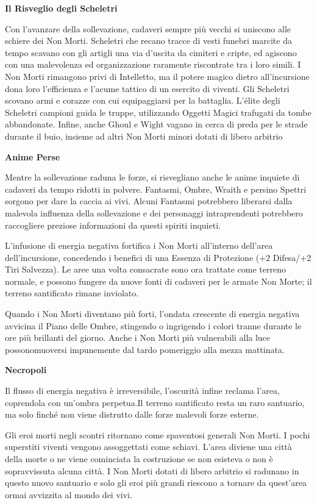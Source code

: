 \documentclass[a4paper,11pt,twoside,openany]{book}
\begin{document}
\textbf{Il Risveglio degli Scheletri}

Con l'avanzare della sollevazione, cadaveri sempre più vecchi si uniscono alle schiere dei Non Morti. Scheletri che recano tracce di vesti funebri marcite da tempo scavano con gli artigli una via d'uscita da cimiteri e cripte, ed agiscono con una malevolenza ed organizzazione raramente riscontrate tra i loro simili. I Non Morti rimangono privi di Intelletto, ma il potere magico dietro all'incursione dona loro l'efficienza e l'acume tattico di un esercito di viventi. Gli Scheletri scovano armi e corazze con cui equipaggiarsi per la battaglia. L'élite degli Scheletri campioni guida le truppe, utilizzando Oggetti Magici trafugati da tombe abbandonate. Infine, anche Ghoul e Wight vagano in cerca di preda per le strade durante il buio, insieme ad altri Non Morti minori dotati di libero arbitrio

\textbf{Anime Perse}

Mentre la sollevazione raduna le forze, si risvegliano anche le anime inquiete di cadaveri da tempo ridotti in polvere. Fantasmi, Ombre, Wraith e persino Spettri sorgono per dare la caccia ai vivi. Alcuni Fantasmi potrebbero liberarsi dalla malevola influenza della sollevazione e dei personaggi intraprendenti potrebbero raccogliere preziose informazioni da questi spiriti inquieti.

L'infusione di energia negativa fortifica i Non Morti all'interno dell'area dell'incursione, concedendo i benefici di una Essenza di Protezione (+2 Difesa/+2 Tiri Salvezza). Le aree una volta consacrate sono ora trattate come terreno normale, e possono fungere da nuove fonti di cadaveri per le armate Non Morte; il terreno santificato rimane inviolato.

Quando i Non Morti diventano più forti, l'ondata crescente di energia negativa avvicina il Piano delle Ombre, stingendo o ingrigendo i colori tranne durante le ore più brillanti del giorno. Anche i Non Morti più vulnerabili alla luce possonomuoversi impunemente dal tardo pomeriggio alla mezza mattinata.

\textbf{Necropoli}

Il flusso di energia negativa è irreversibile, l'oscurità infine reclama l'area, coprendola con un'ombra perpetua.Il terreno santificato resta un raro santuario, ma solo finché non viene distrutto dalle forze malevoli forze esterne.

Gli eroi morti negli scontri ritornano come spaventosi generali Non Morti. I pochi superstiti viventi vengono assoggettati come schiavi. L'area diviene una città della morte o ne viene cominciata la costruzione se non esisteva o non è sopravvissuta alcuna città. I Non Morti dotati di libero arbitrio si radunano in questo nuovo santuario e solo gli eroi più grandi riescono a tornare da quest'area ormai avvizzita al mondo dei vivi.
\end{document}
